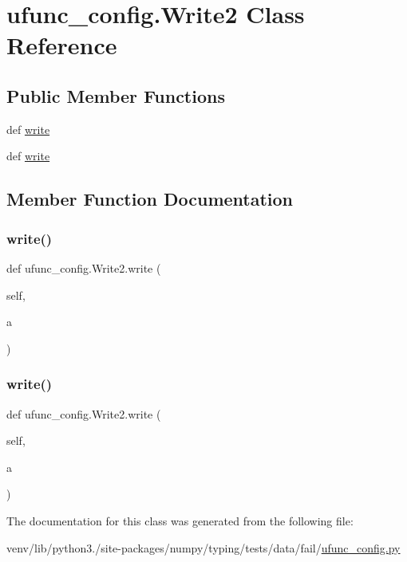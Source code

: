 \hypertarget{classufunc__config_1_1Write2}{}\section{ufunc\+\_\+config.\+Write2 Class Reference}
\label{classufunc__config_1_1Write2}
\subsection*{Public Member Functions}
\begin{DoxyCompactItemize}
\item 
def \hyperlink{classufunc__config_1_1Write2_ae40f9183b7a7a59e88b0eaefd8e4fb8e}{write}
\item 
def \hyperlink{classufunc__config_1_1Write2_ae40f9183b7a7a59e88b0eaefd8e4fb8e}{write}
\end{DoxyCompactItemize}


\subsection{Member Function Documentation}
\mbox{\label{classufunc__config_1_1Write2_ae40f9183b7a7a59e88b0eaefd8e4fb8e}} 
\subsubsection{\texorpdfstring{write()}{write()}\hspace{0.1cm}{\footnotesize\ttfamily [1/2]}}
{\footnotesize\ttfamily def ufunc\+\_\+config.\+Write2.\+write (\begin{DoxyParamCaption}\item[{}]{self,  }\item[{}]{a }\end{DoxyParamCaption})}

\mbox{\label{classufunc__config_1_1Write2_ae40f9183b7a7a59e88b0eaefd8e4fb8e}} 
\subsubsection{\texorpdfstring{write()}{write()}\hspace{0.1cm}{\footnotesize\ttfamily [2/2]}}
{\footnotesize\ttfamily def ufunc\+\_\+config.\+Write2.\+write (\begin{DoxyParamCaption}\item[{}]{self,  }\item[{}]{a }\end{DoxyParamCaption})}



The documentation for this class was generated from the following file\+:\begin{DoxyCompactItemize}
\item 
venv/lib/python3./site-\/packages/numpy/typing/tests/data/fail/\hyperlink{fail_2ufunc__config_8py}{ufunc\+\_\+config.\+py}\end{DoxyCompactItemize}
